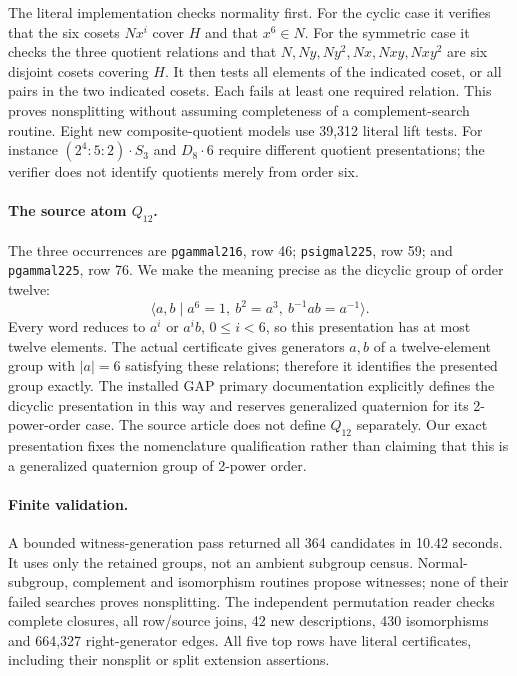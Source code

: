 \documentclass[11pt]{article}
\begin{document}
The literal implementation checks normality first. For the cyclic case
it verifies that the six cosets $Nx^i$ cover $H$ and that $x^6\in N$.
For the symmetric case it checks the three quotient relations and that
$N,Ny,Ny^2,Nx,Nxy,Nxy^2$ are six disjoint cosets covering $H$.
It then tests all elements of the indicated coset, or all pairs in the
two indicated cosets. Each fails at least one required relation. This
proves nonsplitting without assuming completeness of a complement-search
routine. Eight new composite-quotient models use 39,312 literal lift tests.
For instance $(2^4:5:2)\mathbin{\cdot}S_3$ and
$D_8\mathbin{\cdot}6$ require different quotient presentations;
the verifier does not identify quotients merely from order six.

\paragraph{The source atom $Q_{12}$.}
The three occurrences are \texttt{pgammal216}, row 46;
\texttt{psigmal225}, row 59; and \texttt{pgammal225}, row 76.
We make the meaning precise as the dicyclic group of order twelve:
\begin{equation}\label{dic}
\langle a,b\mid a^6=1,\ b^2=a^3,\ b^{-1}ab=a^{-1}\rangle.
\end{equation}
Every word reduces to $a^i$ or $a^ib$, $0\leq i<6$, so this presentation
has at most twelve elements. The actual certificate gives generators
$a,b$ of a twelve-element group with $|a|=6$ satisfying these relations;
therefore it identifies the presented group exactly. The installed GAP
primary documentation explicitly defines the dicyclic presentation in
this way and reserves generalized quaternion for its 2-power-order case.
The source article does not define $Q_{12}$ separately. Our exact
presentation fixes the nomenclature qualification rather than claiming
that this is a generalized quaternion group of 2-power order.

\newpage
\paragraph{Finite validation.}
A bounded witness-generation pass returned all 364 candidates in 10.42
seconds. It uses only the retained groups, not an ambient subgroup census.
Normal-subgroup, complement and isomorphism routines propose witnesses;
none of their failed searches proves nonsplitting. The independent
permutation reader checks complete closures, all row/source joins,
42 new descriptions, 430 isomorphisms and 664,327 right-generator edges.
All five top rows have literal certificates, including their nonsplit
or split extension assertions.
\end{document}
